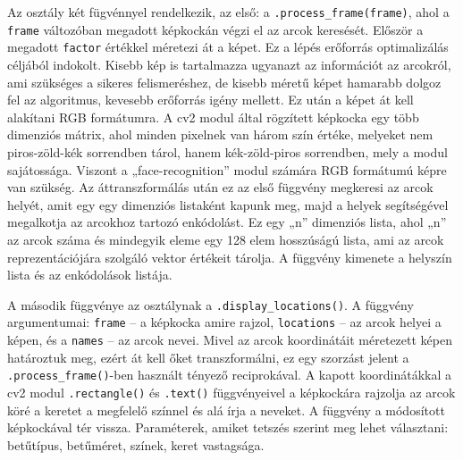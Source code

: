 Az osztály két fügvénnyel rendelkezik, az első: a \verb|.process_frame(frame)|, ahol a \verb|frame| változóban megadott képkockán végzi el az arcok keresését. Először a megadott \verb|factor| értékkel méretezi át a képet. Ez a lépés erőforrás optimalizálás céljából indokolt. Kisebb kép is tartalmazza ugyanazt az információt az arcokról, ami szükséges a sikeres felismeréshez, de kisebb méretű képet hamarabb dolgoz fel az algoritmus, kevesebb erőforrás igény mellett.  Ez után a képet át kell alakítani RGB formátumra. A cv2 modul által rögzített képkocka egy több dimenziós mátrix, ahol minden pixelnek van három szín értéke, melyeket nem piros-zöld-kék sorrendben tárol, hanem kék-zöld-piros sorrendben, mely a modul sajátossága. Viszont a „face-recognition” modul számára RGB formátumú képre van szükség. Az áttranszformálás után ez az első függvény megkeresi az arcok helyét, amit egy egy dimenziós listaként kapunk meg, majd a helyek segítségével megalkotja az arcokhoz tartozó enkódolást. Ez egy „n” dimenziós lista, ahol „n” az arcok száma és mindegyik eleme egy 128 elem hosszúságú lista, ami az arcok reprezentációjára szolgáló vektor értékeit tárolja. A függvény kimenete a helyszín lista és az enkódolások listája.

A második függvénye az osztálynak a \verb|.display_locations()|. A függvény argumentumai: \verb|frame| – a képkocka amire rajzol, \verb|locations| – az arcok helyei a képen, és a \verb|names| – az arcok nevei. Mivel az arcok koordinátáit méretezett képen határoztuk meg, ezért át kell őket transzformálni, ez egy szorzást jelent a \verb|.process_frame()|-ben használt tényező reciprokával. A kapott koordinátákkal a cv2 modul \verb|.rectangle()| és \verb|.text()| függvényeivel a képkockára rajzolja az arcok köré a keretet a megfelelő színnel és alá írja a neveket. A függvény a módosított képkockával tér vissza. Paraméterek, amiket tetszés szerint meg lehet választani: betűtípus, betűméret, színek, keret vastagsága.

